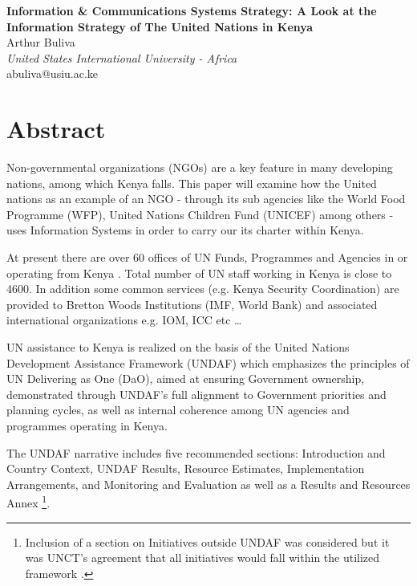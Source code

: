 \documentclass[12pt]{article}
\begin{document}
\thispagestyle{empty}
\vspace*{\fill}
\noindent
\begin{center}
\textbf{
{\huge Information \& Communications Systems Strategy: A Look at the Information Strategy of The United Nations in Kenya}
}\\
\vspace{0.2in}
Arthur Buliva\\
\emph{United States International University - Africa}\\
abuliva@usiu.ac.ke
\end{center}
\vspace*{\fill}

\newpage
\clearpage
{}

\section*{Abstract}

Non-governmental organizations (NGOs) are a key feature in many developing nations, among which Kenya falls. This paper will examine how the United nations as an example of an NGO - through its sub agencies like the World Food Programme (WFP), United Nations Children Fund (UNICEF) among others - uses Information Systems in order to carry our its charter within Kenya.

At present there are over 60 offices of UN Funds, Programmes and Agencies in or operating from Kenya \cite{unon}. Total number of UN staff working in Kenya is close to 4600. In addition some common services (e.g. Kenya Security Coordination) are provided to Bretton Woods Institutions (IMF, World Bank) and associated international organizations e.g. IOM, ICC etc \ldots 

UN assistance to Kenya is realized on the basis of the United Nations Development Assistance Framework (UNDAF) \cite{undaf} which emphasizes the principles of UN Delivering as One (DaO), aimed at ensuring Government ownership, demonstrated through UNDAF’s full alignment to Government priorities and planning cycles, as well as internal coherence among UN agencies and programmes operating in Kenya.

The UNDAF narrative includes five recommended sections: Introduction and Country Context, UNDAF Results, Resource Estimates, Implementation Arrangements, and Monitoring and Evaluation as well as a Results and Resources Annex \footnote{Inclusion of a section on Initiatives outside UNDAF was considered but it was UNCT’s agreement that all initiatives would fall within the utilized framework \cite{undaf}.}.
\end{document}
